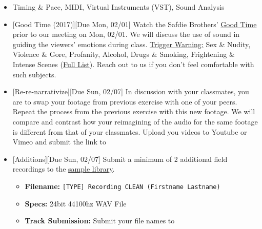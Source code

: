 \def\dMon{Mon, 02/01}
\def\dTues{Tues, 02/02}
\def\dWed{Wed, 02/03}
\def\dThur{Thur, 02/04}
\def\dFri{Fri, 02/05}
\def\dSat{Sat, 02/06}
\def\dSun{Sun, 02/07}
\placeDate


\begin{itemize}[noitemsep,topsep=0pt,leftmargin=*]
	\item {} Timing \& Pace, MIDI, Virtual Instruments (VST), Sound Analysis
	\item {}[Good Time (2017)][Due \dMon] \newline
	      Watch the Safdie Brothers' \href{https://www.netflix.com/watch/80191344?source=35}{Good Time} prior to our meeting on \dMon. We will discuss the use of sound in guiding the viewers' emotions during class.  \newline
	      \ul{Trigger Warning:} Sex \& Nudity, Violence \& Gore, Profanity, Alcohol, Drugs \& Smoking, Frightening \& Intense Scenes (\href{https://www.imdb.com/title/tt4846232/parentalguide}{Full List}). Reach out to us if you don't feel comfortable with such subjects.

	\item {}[Re-re-narrativize][Due \dSun] \newline
	      In discussion with your classmates, you are to swap your footage from previous exercise with one of your peers. Repeat the process from the previous exercise with this new footage. We will compare and contrast how your reimagining of the audio for the same footage is different from that of your classmates. Upload you videos to Youtube or Vimeo and submit the link to \discordE

	\item {}[Additions][Due \dSun] \newline
	      Submit a minimum of 2 additional field recordings to the \href{\#}{sample library}.
	      \begin{itemize}
		      \item \textbf{Filename:} \texttt{[TYPE] Recording CLEAN (Firstname Lastname)}
		      \item \textbf{Specs:} 24bit 44100hz WAV File
		      \item \textbf{Track Submission:} Submit your file names to \discordS
	      \end{itemize}
\end{itemize}